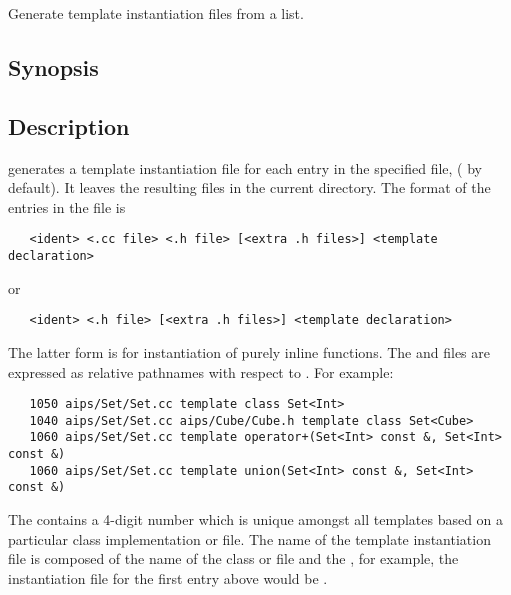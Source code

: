 Generate template instantiation files from a list.

\subsection*{Synopsis}
 
\begin{synopsis}
\end{synopsis}
 
\subsection*{Description}
 
 generates a template instantiation file for each entry in the
specified file, ( by default).  It leaves the resulting
 files in the current directory.  The format of the entries in the
 file is

\begin{verbatim}
   <ident> <.cc file> <.h file> [<extra .h files>] <template declaration>
\end{verbatim}

\noindent
or

\begin{verbatim}
   <ident> <.h file> [<extra .h files>] <template declaration>
\end{verbatim}

\noindent
The latter form is for instantiation of purely inline functions.  The
 and  files are expressed as relative pathnames with
respect to .  For example:

\begin{verbatim}
   1050 aips/Set/Set.cc template class Set<Int>
   1040 aips/Set/Set.cc aips/Cube/Cube.h template class Set<Cube>
   1060 aips/Set/Set.cc template operator+(Set<Int> const &, Set<Int> const &)
   1060 aips/Set/Set.cc template union(Set<Int> const &, Set<Int> const &)
\end{verbatim}

\noindent
The  contains a 4-digit number which is unique amongst all
templates based on a particular class implementation  or 
file.  The name of the template instantiation  file is composed of
the name of the class  or  file and the , for
example, the instantiation file for the first entry above would be
.


